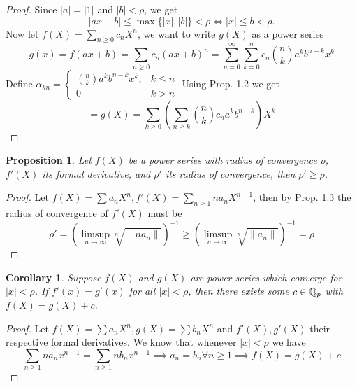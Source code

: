 \documentclass[a4paper]{article}
\theoremstyle{plain}
\newtheorem{prop}[thm]{Proposition}
\newtheorem{Cor}[thm]{Corollary}
\theoremstyle{definition}
\begin{document}
\begin{proof}
  Since $|a| = |1|$ and $|b| < \rho$, we get
  $$|ax + b| \leq \max\{|x|, |b|\} < \rho \iff |x| \leq b < \rho.$$
  Now let $f(X) = \sum_{n \geq 0}c_{n}X^{n}$, we want to write $g(X)$ as a power series
  $$g(x) = f(ax+b) = \sum_{n \geq 0}c_{n}(ax+b)^{n} = \sum_{n = 0}^{\infty} \sum _{k=0}^{n}c_{n}\binom nk a^{k}b^{n-k}x^{k}$$
  Define $\alpha_{kn} = \begin{cases}\binom nk a^{k}b^{n-k}x^{k}, & k \leq n \\ 0 & k > n\end{cases}$
  Using Prop. 1.2 we get $$= g(X) = \sum_{k \geq 0}\left( \sum_{n \geq k} \binom nk c_{n}a^{k}b^{n-k}\right)X^{k}$$
\end{proof}
\begin{prop}
  Let $f(X)$ be a power series with radius of convergence $\rho$, $f'(X)$ its formal derivative, and $\rho'$ its radius of convergence, then $\rho' \geq \rho$.
\end{prop}
\begin{proof}
  Let $f(X) = \sum a_{n}X^{n}, f'(X) = \sum_{n \geq 1} na_{n}X^{n-1}$, then by Prop. 1.3 the radius of convergence of $f'(X)$ must be
  $$\rho' = \left( \limsup_{n \to \infty} \sqrt[n]{\|na_{n}\|} \right)^{-1} \geq \left( \limsup_{n \to \infty} \sqrt[n]{\|a_{n}\|} \right)^{-1} = \rho$$
\end{proof}
\begin{Cor} Suppose $f(X)$ and $g(X)$ are power series which converge for $|x| < \rho$. If $f'(x)=g'(x)$ for all $|x| < \rho$, then there exists some $c \in \Bbb Q_{p}$ with $f(X)=g(X)+c$.
\end{Cor}
\begin{proof}
  Let $f(X) = \sum a_{n}X^{n}, g(X) = \sum b_{n}X^{n}$ and $f'(X), g'(X)$ their respective formal derivatives. We know that whenever $|x| < \rho$ we have
  $$\sum_{n \geq 1}na_{n}x^{n-1} = \sum_{n \geq 1}nb_{n}x^{n-1} \implies a_{n} = b_{n} \forall n \geq 1 \implies f(X) = g(X) + c$$
\end{proof}
\end{document}
